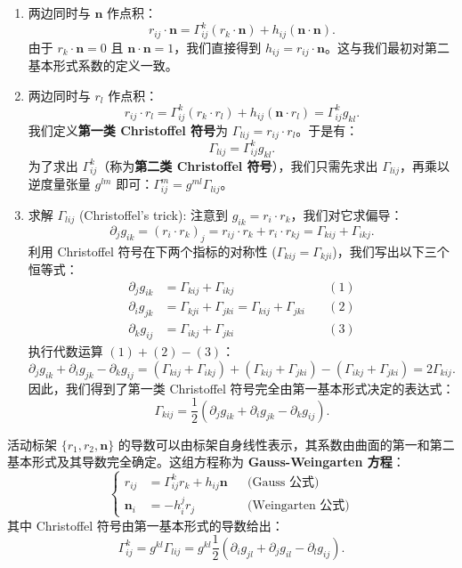 \documentclass[lang=cn,10pt,thmcnt=section]{elegantbook}
\renewcommand{\vec}[1]{\mathbf{#1}}
\begin{document}
\begin{enumerate}
    \item 两边同时与 $\vec{n}$ 作点积：
    \[ r_{ij} \cdot \vec{n} = \Gamma_{ij}^k (r_k \cdot \vec{n}) + h_{ij} (\vec{n} \cdot \vec{n}). \]
    由于 $r_k \cdot \vec{n} = 0$ 且 $\vec{n} \cdot \vec{n} = 1$，我们直接得到 $h_{ij} = r_{ij} \cdot \vec{n}$。这与我们最初对第二基本形式系数的定义一致。
    
    \item 两边同时与 $r_l$ 作点积：
    \[ r_{ij} \cdot r_l = \Gamma_{ij}^k (r_k \cdot r_l) + h_{ij} (\vec{n} \cdot r_l) = \Gamma_{ij}^k g_{kl}. \]
    我们定义\textbf{第一类 Christoffel 符号}为 $\Gamma_{lij} = r_{ij} \cdot r_l$。于是有：
    \[ \Gamma_{lij} = \Gamma_{ij}^k g_{kl}. \]
    为了求出 $\Gamma_{ij}^k$（称为\textbf{第二类 Christoffel 符号}），我们只需先求出 $\Gamma_{lij}$，再乘以逆度量张量 $g^{lm}$ 即可：$\Gamma_{ij}^m = g^{ml} \Gamma_{lij}$。
    
    \item 求解 $\Gamma_{lij}$ (Christoffel's trick):
    注意到 $g_{ik} = r_i \cdot r_k$，我们对它求偏导：
    \[ \partial_j g_{ik} = (r_i \cdot r_k)_j = r_{ij} \cdot r_k + r_i \cdot r_{kj} = \Gamma_{kij} + \Gamma_{ikj}. \]
    利用 Christoffel 符号在下两个指标的对称性 ($\Gamma_{kij} = \Gamma_{kji}$)，我们写出以下三个恒等式：
    \begin{align*}
        \partial_j g_{ik} &= \Gamma_{kij} + \Gamma_{ikj} \quad &(1) \\
        \partial_i g_{jk} &= \Gamma_{kji} + \Gamma_{jki} = \Gamma_{kij} + \Gamma_{jki} \quad &(2) \\
        \partial_k g_{ij} &= \Gamma_{ikj} + \Gamma_{jki} \quad &(3)
    \end{align*}
    执行代数运算 $(1)+(2)-(3)$：
    \[ \partial_j g_{ik} + \partial_i g_{jk} - \partial_k g_{ij} = ( \Gamma_{kij} + \Gamma_{ikj} ) + ( \Gamma_{kij} + \Gamma_{jki} ) - ( \Gamma_{ikj} + \Gamma_{jki} ) = 2 \Gamma_{kij}. \]
    因此，我们得到了第一类 Christoffel 符号完全由第一基本形式决定的表达式：
    \[ \Gamma_{kij} = \frac{1}{2}(\partial_j g_{ik} + \partial_i g_{jk} - \partial_k g_{ij}). \]
\end{enumerate}
\begin{proposition}[曲面论基本方程]
活动标架 $\{r_1, r_2, \vec{n}\}$ 的导数可以由标架自身线性表示，其系数由曲面的第一和第二基本形式及其导数完全确定。这组方程称为 \textbf{Gauss-Weingarten 方程}：
\[
\left\{
\begin{aligned}
    r_{ij} &= \Gamma_{ij}^k r_k + h_{ij} \vec{n} && \text{(Gauss 公式)} \\
    \vec{n}_i &= -h_i^j r_j && \text{(Weingarten 公式)}
\end{aligned}
\right.
\]
其中 Christoffel 符号由第一基本形式的导数给出：
\[
\Gamma_{ij}^k = g^{kl} \Gamma_{lij} = g^{kl} \frac{1}{2}(\partial_i g_{jl} + \partial_j g_{il} - \partial_l g_{ij}).
\]
\end{proposition}
\end{document}
